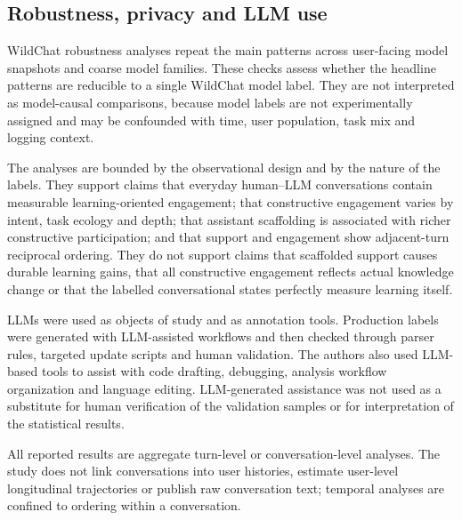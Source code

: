 \subsection{Robustness, privacy and LLM use}

WildChat robustness analyses repeat the main patterns across user-facing model snapshots and coarse model families. These checks assess whether the headline patterns are reducible to a single WildChat model label. They are not interpreted as model-causal comparisons, because model labels are not experimentally assigned and may be confounded with time, user population, task mix and logging context.

The analyses are bounded by the observational design and by the nature of the labels. They support claims that everyday human--LLM conversations contain measurable learning-oriented engagement; that constructive engagement varies by intent, task ecology and depth; that assistant scaffolding is associated with richer constructive participation; and that support and engagement show adjacent-turn reciprocal ordering. They do not support claims that scaffolded support causes durable learning gains, that all constructive engagement reflects actual knowledge change or that the labelled conversational states perfectly measure learning itself.

LLMs were used as objects of study and as annotation tools. Production labels were generated with LLM-assisted workflows and then checked through parser rules, targeted update scripts and human validation. The authors also used LLM-based tools to assist with code drafting, debugging, analysis workflow organization and language editing. LLM-generated assistance was not used as a substitute for human verification of the validation samples or for interpretation of the statistical results.

All reported results are aggregate turn-level or conversation-level analyses. The study does not link conversations into user histories, estimate user-level longitudinal trajectories or publish raw conversation text; temporal analyses are confined to ordering within a conversation.
